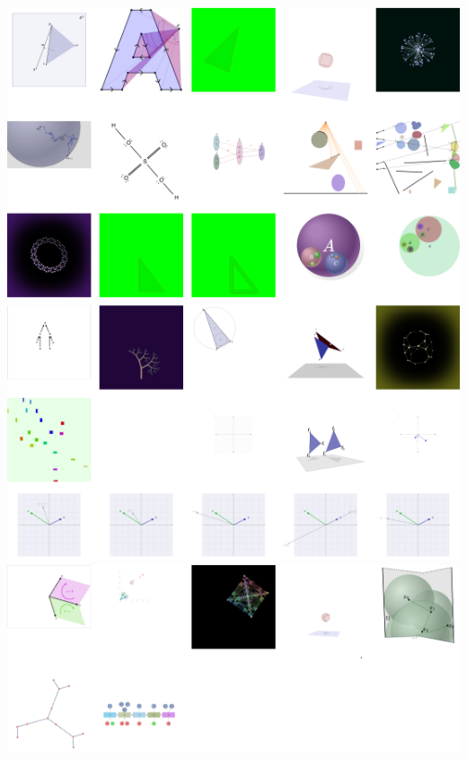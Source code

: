 \pagebreak
\includegraphics[width=\linewidth]{assets/appendix/Group 13.png}
\pagebreak
\includegraphics[width=\linewidth]{assets/appendix/Group 14.png}
\pagebreak

